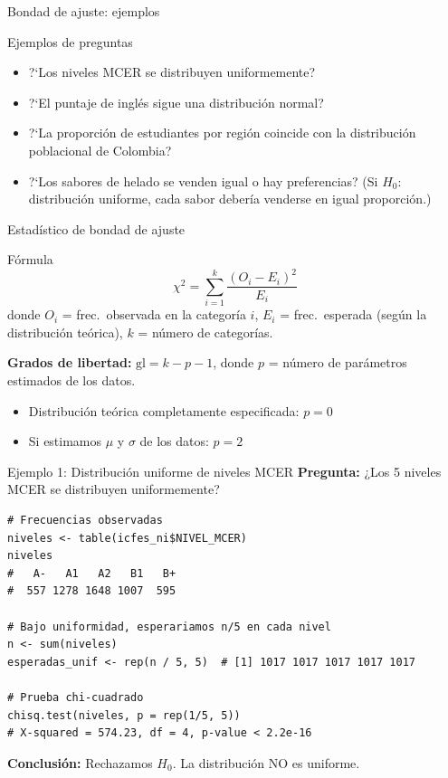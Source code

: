 \documentclass[aspectratio=169, 11pt]{beamer}
\begin{document}
\begin{frame}{Bondad de ajuste: ejemplos}
\begin{exampleblock}{Ejemplos de preguntas}
\begin{itemize}
  \item ?`Los niveles MCER se distribuyen uniformemente?
  \item ?`El puntaje de ingl\'es sigue una distribuci\'on normal?
  \item ?`La proporci\'on de estudiantes por regi\'on coincide con la distribuci\'on poblacional de Colombia?
  \item ?`Los sabores de helado se venden igual o hay preferencias? (Si $H_0$: distribuci\'on uniforme, cada sabor deber\'ia venderse en igual proporci\'on.)
\end{itemize}
\end{exampleblock}
\end{frame}

\begin{frame}{Estad\'istico de bondad de ajuste}
\begin{block}{F\'ormula}
\[
\chi^2 = \sum_{i=1}^{k} \frac{(O_i - E_i)^2}{E_i}
\]
\vspace{-0.2cm}
donde $O_i$ = frec.\ observada en la categor\'ia $i$, $E_i$ = frec.\ esperada (seg\'un la distribuci\'on te\'orica), $k$ = n\'umero de categor\'ias.
\end{block}

\vspace{0.1cm}
\textbf{Grados de libertad:}
$\text{gl} = k - p - 1$, donde $p$ = n\'umero de par\'ametros estimados de los datos.
\begin{itemize}
  \item Distribuci\'on te\'orica completamente especificada: $p = 0$
  \item Si estimamos $\mu$ y $\sigma$ de los datos: $p = 2$
\end{itemize}
\end{frame}

\begin{frame}[fragile]{Ejemplo 1: Distribución uniforme de niveles MCER}
\textbf{Pregunta:} ¿Los 5 niveles MCER se distribuyen uniformemente?
\begin{lstlisting}
# Frecuencias observadas
niveles <- table(icfes_ni$NIVEL_MCER)
niveles
#   A-   A1   A2   B1   B+
#  557 1278 1648 1007  595

# Bajo uniformidad, esperariamos n/5 en cada nivel
n <- sum(niveles)
esperadas_unif <- rep(n / 5, 5)  # [1] 1017 1017 1017 1017 1017

# Prueba chi-cuadrado
chisq.test(niveles, p = rep(1/5, 5))
# X-squared = 574.23, df = 4, p-value < 2.2e-16
\end{lstlisting}

\textbf{Conclusión:} Rechazamos $H_0$. La distribución NO es uniforme.
\end{frame}
\end{document}
